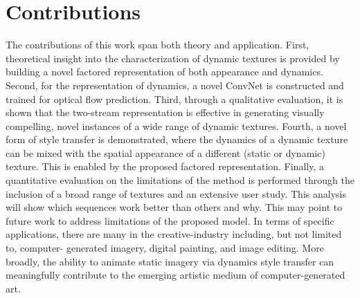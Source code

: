\section{Contributions}


The contributions of this work span both theory and application. First,
theoretical insight into the characterization of dynamic textures is provided by 
building a novel factored representation of both appearance and dynamics. Second, 
for the representation of dynamics, a novel ConvNet is constructed and trained for 
optical flow prediction. Third, through a qualitative evaluation, it is shown that the two-stream representation is 
effective in generating visually compelling, novel instances of a wide range of 
dynamic textures. Fourth, a novel form of style transfer is demonstrated, 
where the dynamics of a dynamic texture can be mixed with the spatial appearance 
of a different (static or dynamic) texture. This is enabled by the proposed factored 
representation. Finally, a quantitative evaluation on the limitations of the method is performed through 
the inclusion of a broad range of textures and an extensive user study. This analysis will show which 
sequences work better than others and why. This may point to future work to 
address limitations of the proposed model. In terms of specific applications, 
there are many in the creative-industry including, but not limited to, computer-
generated imagery, digital painting, and image editing. More broadly, the ability 
to animate static imagery via dynamics style transfer can meaningfully contribute 
to the emerging artistic medium of computer-generated art.
